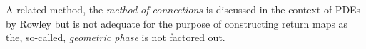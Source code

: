 A related method, the \emph{method of connections} is discussed
in the context of PDEs by Rowley \etal{} but
is not adequate for the purpose of constructing return maps as 
the, so-called, \emph{geometric phase} is not factored out.
% 

\renewcommand{\Group}{\ensuremath{\Gamma}}    %
